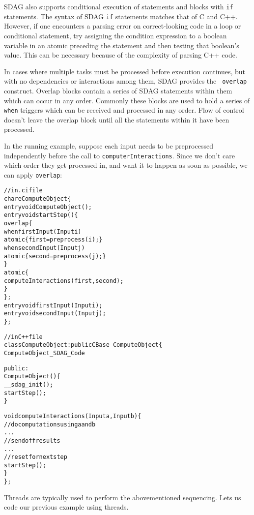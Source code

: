 SDAG also supports conditional execution of statements and blocks with {\tt if}
statements. The syntax of SDAG {\tt if} statements matches that of C and
C++. However, if one encounters a parsing error on correct-looking code in a
loop or conditional statement, try assigning the condition expression to a
boolean variable in an atomic preceding the statement and then testing that
boolean's value. This can be necessary because of the complexity of parsing C++
code.

In cases where multiple tasks must be processed before execution continues, but
with no dependencies or interactions among them, SDAG provides the {\tt
  overlap} construct. Overlap blocks contain a series of SDAG statements within
them which can occur in any order. Commonly these blocks are used to hold a
series of {\tt when} triggers which can be received and processed in any
order. Flow of control doesn't leave the overlap block until all the statements
within it have been processed.

In the running example, suppose each input needs to be preprocessed independently
before the call to {\tt computerInteractions}. Since we don't care which order
they get processed in, and want it to happen as soon as possible, we can apply
{\tt overlap}:
\begin{center}
\begin{alltt}
// in .ci file
chare ComputeObject \{
  entry void ComputeObject();
  entry void startStep() \{
    overlap \{
      when firstInput(Input i)
        atomic \{ first = preprocess(i); \}
      when secondInput(Input j)
        atomic \{ second = preprocess(j); \}
     \}
     atomic \{
       computeInteractions(first, second);
     \}
  \};
  entry void firstInput(Input i);
  entry void secondInput(Input j);
\};

// in C++ file
class ComputeObject : public CBase_ComputeObject \{
  ComputeObject_SDAG_Code

public:
  ComputeObject() \{
    __sdag_init();
    startStep();
  \}

  void computeInteractions(Input a, Input b) \{
    // do computations using a and b
    . . .
    // send off results
    . . .
    // reset for next step
    startStep();
  \}
\};
\end{alltt}
\end{center}



Threads are typically used to perform the abovementioned sequencing.
Lets us code our previous example using threads.


